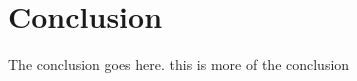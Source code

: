 \documentclass[10pt, conference, compsocconf]{IEEEtran}
\begin{document}


\section{Conclusion}
The conclusion goes here. this is more of the conclusion



\end{document}
